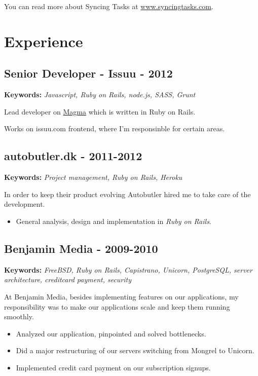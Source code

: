 \documentclass[a4paper]{article}
\newcommand{\keywords}[1]{\small\textbf{Keywords:} \emph{#1}\normalsize}
\begin{document}
You can read more about Syncing Tasks at \href{http://www.syncingtasks.com}{www.syncingtasks.com}.

\section*{Experience}

\subsection*{Senior Developer - Issuu - 2012}
\keywords{Javascript, Ruby on Rails, node.js, SASS, Grunt}

Lead developer on \href{http://www.magmahq.com}{Magma} which is written in Ruby on Rails.

Works on issuu.com frontend, where I'm responsinble for certain areas.

\subsection*{autobutler.dk - 2011-2012}
\keywords{Project management, Ruby on Rails, Heroku}

In order to keep their product evolving Autobutler hired me to take care of the development.

\begin{itemize}
	\item General analysis, design and implementation in \emph{Ruby on Rails}.
\end{itemize}

\subsection*{Benjamin Media - 2009-2010}

\keywords{FreeBSD, Ruby on Rails, Capistrano, Unicorn, PostgreSQL, server architecture, creditcard payment, security}

At Benjamin Media, besides implementing features on our applications, my responsibility was to make our applications scale and keep them running smoothly.

\begin{itemize}
	\item Analyzed our application, pinpointed and solved bottlenecks.
	\item Did a major restructuring of our servers switching from Mongrel to Unicorn.
	\item Implemented credit card payment on our subscription signups.
\end{itemize}
\end{document}
